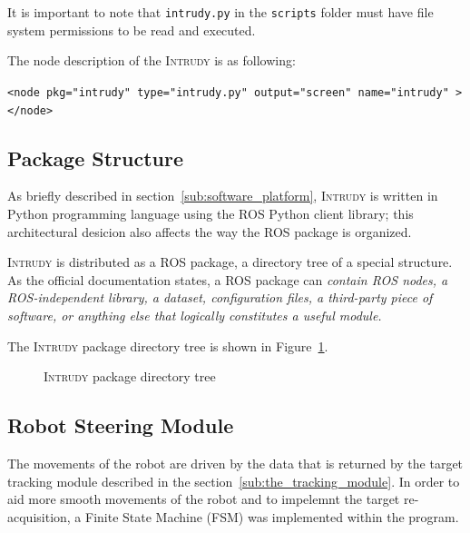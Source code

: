 \documentclass[12pt,a4paper]{scrartcl}
\newcommand{\intrudy}{\textsc{Intrudy}\xspace}
\begin{document}
	It is important to note that \texttt{intrudy.py} in the \texttt{scripts} folder must have file system permissions to be read and executed.
	
	The node description of the \intrudy is as following:

	\texttt{<node pkg="intrudy" type="intrudy.py" output="screen" name="intrudy" ></node>}

	\subsection{Package Structure} %
	\label{sub:package_structure}

		As briefly described in section~\ref{sub:software_platform}, \intrudy is written in Python programming language using the ROS Python client library; this architectural desicion also affects the way the ROS package is organized.
		
		\intrudy is distributed as a ROS package, a directory tree of a special structure. As the official documentation  \cite{ROSPackages} states, a ROS package can \textit{contain ROS nodes, a ROS-independent library, a dataset, configuration files, a third-party piece of software, or anything else that logically constitutes a useful module.}

		The \intrudy package directory tree is shown in Figure~\ref{fig:package_directory_structure}.

		\begin{figure}[htc]
			\caption{\intrudy package directory tree}
			\label{fig:package_directory_structure}
		\end{figure}


\subsection{Robot Steering Module} %
\label{sub:FSM}
	The movements of the robot are driven by the data that is returned by the target tracking module described in the section~\ref{sub:the_tracking_module}. In order to aid more smooth movements of the robot and to impelemnt the target re-acquisition, a Finite State Machine (FSM) was implemented within the program. 
\end{document}
